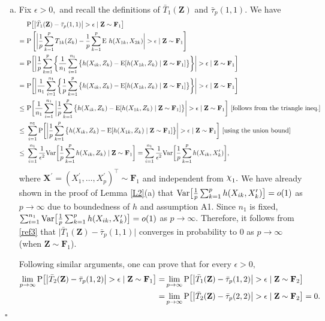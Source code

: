 \documentclass[twoside]{article}
\newcommand{\bX}{\mathbf{X}}
\newcommand{\bZ}{\mathbf{Z}}
\newcommand{\bF}{\mathbf{F}}
\newcommand{\0}{\mathbf{0}}
\newcommand{\1}{\mathbf{1}}
\newcommand*{\QEDB}{\hfill\ensuremath{\square}}
\DeclareRobustCommand{\rchi}{{\mathpalette\irchi\relax}}
\newcommand{\irchi}[2]{\raisebox{\depth}{$#1\chi$}} %
\numberwithin{equation}{section}
\begin{document}
\begin{enumerate}[(a)]
\item Fix $\epsilon>0,$ and recall the definitions of $\bar{T}_{1}(\bZ)$ and $\bar{\tau}_p(1,1)$. We have
\begin{align}\label{ref3}
&\ {\rm P}\big [\big |\bar{T}_{1}(\bZ) - \bar{\tau}_p(1,1)\big |>\epsilon\mid \bZ\sim\bF_1\big ]\nonumber \\
= &\ {\rm P}\left [\bigg |\frac{1}{p}\sum_{k=1}^p T_{1k}(Z_k) - \frac{1}{p}\sum_{k=1}^p {\rm E}\ h(X_{1k},X_{2k})\bigg |>\epsilon\mid \bZ\sim\bF_1 \right ]\nonumber \\
= &\ {\rm P}\bigg [\bigg |\frac{1}{p}\sum_{k=1}^p \bigg \{\frac{1}{n_1}\sum_{i=1}^{n_1}\big \{h(X_{ik},Z_k) - {\rm E}[h(X_{1k},Z_k)\mid \bZ\sim\bF_1]\big \}\bigg \}\bigg |>\epsilon\mid \bZ\sim\bF_1 \bigg ]\nonumber \\
= &\ {\rm P}\bigg [\bigg |\frac{1}{n_1}\sum_{i=1}^{n_1}\bigg \{\frac{1}{p}\sum_{k=1}^p\big \{h(X_{ik},Z_k) - {\rm E}[h(X_{1k},Z_k)\mid \bZ\sim\bF_1]\big \}\bigg \}\bigg |>\epsilon\mid \bZ\sim\bF_1 \bigg ]\nonumber \\
\leq &\ {\rm P}\bigg [\frac{1}{n_1}\sum_{i=1}^{n_1}\bigg |\frac{1}{p}\sum_{k=1}^p\big \{h(X_{ik},Z_k) - {\rm E}[h(X_{1k},Z_k)\mid \bZ\sim\bF_1]\big \}\bigg |>\epsilon\mid \bZ\sim\bF_1 \bigg ]\ [\text{follows from the triangle ineq.}]\nonumber \\
\leq &\ \sum_{i=1}^{n_1}{\rm P}\bigg [\bigg |\frac{1}{p}\sum_{k=1}^p\big \{h(X_{ik},Z_k) - {\rm E}[h(X_{1k},Z_k)\mid \bZ\sim\bF_1]\big \}\bigg |>\epsilon\mid \bZ\sim\bF_1 \bigg ]\ [\text{using the union bound}]\nonumber \\
\leq &\ \sum_{i=1}^{n_1}\frac{1}{\epsilon^2}{\rm Var}\bigg [\frac{1}{p}\sum_{k=1}^p h(X_{ik},Z_k)\mid \bZ\sim \bF_1\bigg ]=  \sum_{i=1}^{n_1}\frac{1}{\epsilon^2}{\rm Var}\bigg [\frac{1}{p}\sum_{k=1}^p h(X_{ik},X^\prime_k)\bigg ],
\end{align}
where $\bX^\prime=(X^\prime_1,\ldots, X^\prime_p)^\top\sim\bF_1$ and independent from $\rchi_1.$ We have already shown in the proof of Lemma \ref{L2}(a) that ${\rm Var}\big [\frac{1}{p}\sum_{k=1}^p h(X_{ik},X^\prime_k)\big ]=o(1)$ as $p\to\infty$ due to boundedness of $h$ and assumption A1. Since $n_1$ is fixed, $\sum_{i=1}^{n_1}{\rm Var}\big [\frac{1}{p}\sum_{k=1}^p h(X_{ik},X^\prime_k)\big ]=o(1)$ as $p\to\infty$. Therefore, it follows from \eqref{ref3} that $\big |\bar{T}_{1}(\bZ) - \bar{\tau}_p(1,1)\big |$ converges in probability to 0 as $p\to\infty$ (when $\bZ\sim\bF_1$).

Following similar arguments, one can prove that for every $\epsilon >0,$
\begin{align*}
\lim_{p\to\infty}{\rm P}\big[\big |\bar{T}_{2}(\bZ) - \bar{\tau}_p(1,2)\big |>\epsilon\mid\bZ\sim\bF_1\big ]=&\lim_{p\to\infty}{\rm P}\big[\big |\bar{T}_{1}(\bZ) - \bar{\tau}_p(1,2)\big |>\epsilon\mid\bZ\sim\bF_2\big ]\\
=&\lim_{p\to\infty}{\rm P}\big[\big |\bar{T}_{2}(\bZ) - \bar{\tau}_p(2,2)\big |>\epsilon\mid\bZ\sim\bF_2\big ]=0.
\end{align*}
\end{enumerate}\hfill \QEDB\newline
\end{document}
